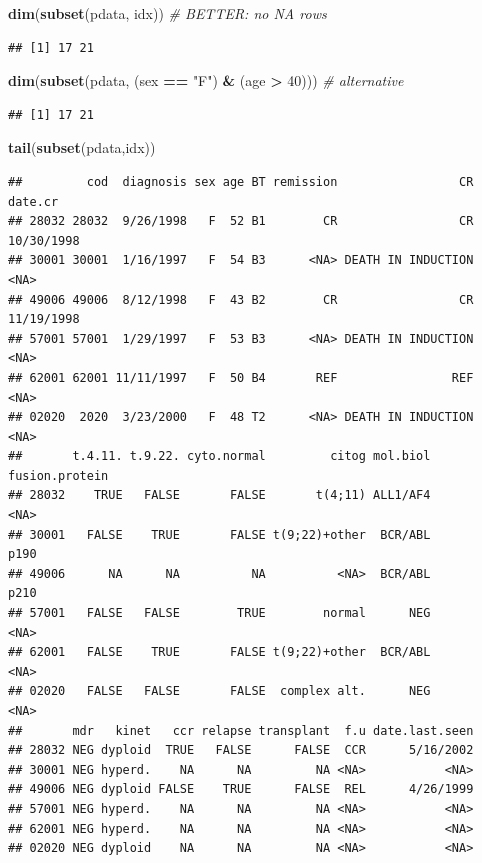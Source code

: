 \documentclass[]{article}
\newenvironment{Shaded}{\begin{snugshade}}{\end{snugshade}}
\newcommand{\KeywordTok}[1]{\textcolor[rgb]{0.13,0.29,0.53}{\textbf{#1}}}
\newcommand{\DecValTok}[1]{\textcolor[rgb]{0.00,0.00,0.81}{#1}}
\newcommand{\StringTok}[1]{\textcolor[rgb]{0.31,0.60,0.02}{#1}}
\newcommand{\CommentTok}[1]{\textcolor[rgb]{0.56,0.35,0.01}{\textit{#1}}}
\newcommand{\OperatorTok}[1]{\textcolor[rgb]{0.81,0.36,0.00}{\textbf{#1}}}
\newcommand{\NormalTok}[1]{#1}
\theoremstyle{definition}
\theoremstyle{definition}
\theoremstyle{remark}
\begin{document}
\begin{Shaded}
\begin{Highlighting}[]
\KeywordTok{dim}\NormalTok{(}\KeywordTok{subset}\NormalTok{(pdata, idx))    }\CommentTok{# BETTER: no NA rows}
\end{Highlighting}
\end{Shaded}

\begin{verbatim}
## [1] 17 21
\end{verbatim}

\begin{Shaded}
\begin{Highlighting}[]
\KeywordTok{dim}\NormalTok{(}\KeywordTok{subset}\NormalTok{(pdata, (sex }\OperatorTok{==}\StringTok{ "F"}\NormalTok{) }\OperatorTok{&}\StringTok{ }\NormalTok{(age }\OperatorTok{>}\StringTok{ }\DecValTok{40}\NormalTok{)))  }\CommentTok{# alternative}
\end{Highlighting}
\end{Shaded}

\begin{verbatim}
## [1] 17 21
\end{verbatim}

\begin{Shaded}
\begin{Highlighting}[]
\KeywordTok{tail}\NormalTok{(}\KeywordTok{subset}\NormalTok{(pdata,idx))}
\end{Highlighting}
\end{Shaded}

\begin{verbatim}
##         cod  diagnosis sex age BT remission                 CR    date.cr
## 28032 28032  9/26/1998   F  52 B1        CR                 CR 10/30/1998
## 30001 30001  1/16/1997   F  54 B3      <NA> DEATH IN INDUCTION       <NA>
## 49006 49006  8/12/1998   F  43 B2        CR                 CR 11/19/1998
## 57001 57001  1/29/1997   F  53 B3      <NA> DEATH IN INDUCTION       <NA>
## 62001 62001 11/11/1997   F  50 B4       REF                REF       <NA>
## 02020  2020  3/23/2000   F  48 T2      <NA> DEATH IN INDUCTION       <NA>
##       t.4.11. t.9.22. cyto.normal         citog mol.biol fusion.protein
## 28032    TRUE   FALSE       FALSE       t(4;11) ALL1/AF4           <NA>
## 30001   FALSE    TRUE       FALSE t(9;22)+other  BCR/ABL           p190
## 49006      NA      NA          NA          <NA>  BCR/ABL           p210
## 57001   FALSE   FALSE        TRUE        normal      NEG           <NA>
## 62001   FALSE    TRUE       FALSE t(9;22)+other  BCR/ABL           <NA>
## 02020   FALSE   FALSE       FALSE  complex alt.      NEG           <NA>
##       mdr   kinet   ccr relapse transplant  f.u date.last.seen
## 28032 NEG dyploid  TRUE   FALSE      FALSE  CCR      5/16/2002
## 30001 NEG hyperd.    NA      NA         NA <NA>           <NA>
## 49006 NEG dyploid FALSE    TRUE      FALSE  REL      4/26/1999
## 57001 NEG hyperd.    NA      NA         NA <NA>           <NA>
## 62001 NEG hyperd.    NA      NA         NA <NA>           <NA>
## 02020 NEG dyploid    NA      NA         NA <NA>           <NA>
\end{verbatim}
\end{document}
